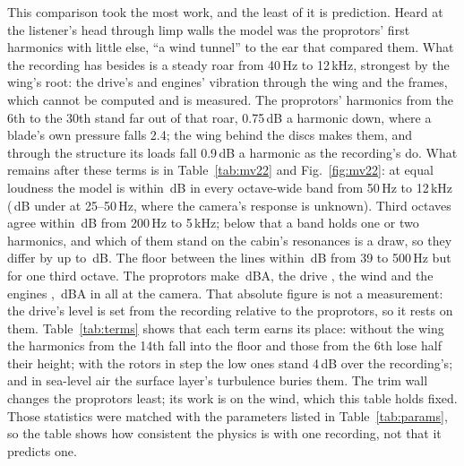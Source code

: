 \documentclass[10pt,a4paper,twocolumn]{article}
\begin{document}
This comparison took the most work, and the least of it is prediction. Heard at the listener's head through limp walls the model was the proprotors' first harmonics with little else, ``a wind tunnel'' to the ear that compared them. What the recording has besides is a steady roar from 40\,Hz to 12\,kHz, strongest by the wing's root: the drive's and engines' vibration through the wing and the frames, which cannot be computed and is measured. The proprotors' harmonics from the 6th to the 30th stand far out of that roar, 0.75\,dB a harmonic down, where a blade's own pressure falls 2.4; the wing behind the discs makes them, and through the structure its loads fall 0.9\,dB a harmonic as the recording's do. What remains after these terms is in Table~\ref{tab:mv22} and Fig.~\ref{fig:mv22}: at equal loudness the model is within \NMvBand\,dB in every octave-wide band from 50\,Hz to 12\,kHz (\NMvLow\,dB under at 25--50\,Hz, where the camera's response is unknown). Third octaves agree within \NMvThirdMid\,dB from 200\,Hz to 5\,kHz; below that a band holds one or two harmonics, and which of them stand on the cabin's resonances is a draw, so they differ by up to \NMvThirdLow\,dB. The floor between the lines within \NMvFloor\,dB from 39 to 500\,Hz but for one third octave. The proprotors make \NMvRotors\,dBA, the drive \NMvDrive, the wind \NMvWind{} and the engines \NMvEngines, \NMvAll\,dBA in all at the camera. That absolute figure is not a measurement: the drive's level is set from the recording relative to the proprotors, so it rests on them. Table~\ref{tab:terms} shows that each term earns its place: without the wing the harmonics from the 14th fall into the floor and those from the 6th lose half their height; with the rotors in step the low ones stand 4\,dB over the recording's; and in sea-level air the surface layer's turbulence buries them. The trim wall changes the proprotors least; its work is on the wind, which this table holds fixed. Those statistics were matched with the parameters listed in Table~\ref{tab:params}, so the table shows how consistent the physics is with one recording, not that it predicts one.
\end{document}
